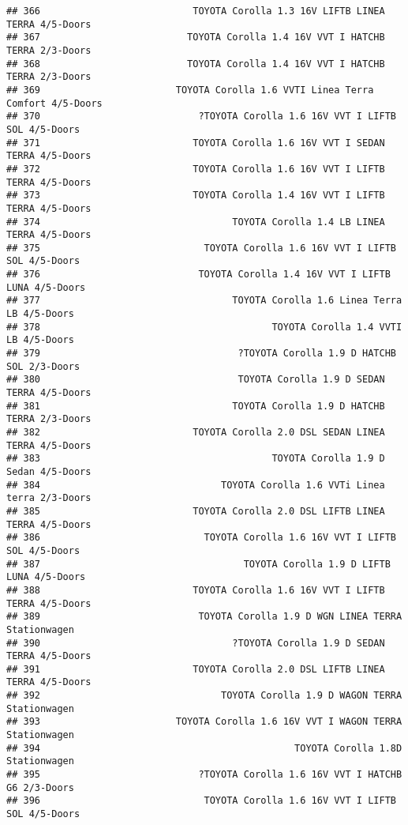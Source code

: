 \documentclass[]{article}
\begin{document}
\begin{verbatim}
## 366                           TOYOTA Corolla 1.3 16V LIFTB LINEA TERRA 4/5-Doors
## 367                          TOYOTA Corolla 1.4 16V VVT I HATCHB TERRA 2/3-Doors
## 368                          TOYOTA Corolla 1.4 16V VVT I HATCHB TERRA 2/3-Doors
## 369                        TOYOTA Corolla 1.6 VVTI Linea Terra Comfort 4/5-Doors
## 370                            ?TOYOTA Corolla 1.6 16V VVT I LIFTB SOL 4/5-Doors
## 371                           TOYOTA Corolla 1.6 16V VVT I SEDAN TERRA 4/5-Doors
## 372                           TOYOTA Corolla 1.6 16V VVT I LIFTB TERRA 4/5-Doors
## 373                           TOYOTA Corolla 1.4 16V VVT I LIFTB TERRA 4/5-Doors
## 374                                  TOYOTA Corolla 1.4 LB LINEA TERRA 4/5-Doors
## 375                             TOYOTA Corolla 1.6 16V VVT I LIFTB SOL 4/5-Doors
## 376                            TOYOTA Corolla 1.4 16V VVT I LIFTB LUNA 4/5-Doors
## 377                                  TOYOTA Corolla 1.6 Linea Terra LB 4/5-Doors
## 378                                         TOYOTA Corolla 1.4 VVTI LB 4/5-Doors
## 379                                   ?TOYOTA Corolla 1.9 D HATCHB SOL 2/3-Doors
## 380                                   TOYOTA Corolla 1.9 D SEDAN TERRA 4/5-Doors
## 381                                  TOYOTA Corolla 1.9 D HATCHB TERRA 2/3-Doors
## 382                           TOYOTA Corolla 2.0 DSL SEDAN LINEA TERRA 4/5-Doors
## 383                                         TOYOTA Corolla 1.9 D Sedan 4/5-Doors
## 384                                TOYOTA Corolla 1.6 VVTi Linea terra 2/3-Doors
## 385                           TOYOTA Corolla 2.0 DSL LIFTB LINEA TERRA 4/5-Doors
## 386                             TOYOTA Corolla 1.6 16V VVT I LIFTB SOL 4/5-Doors
## 387                                    TOYOTA Corolla 1.9 D LIFTB LUNA 4/5-Doors
## 388                           TOYOTA Corolla 1.6 16V VVT I LIFTB TERRA 4/5-Doors
## 389                            TOYOTA Corolla 1.9 D WGN LINEA TERRA Stationwagen
## 390                                  ?TOYOTA Corolla 1.9 D SEDAN TERRA 4/5-Doors
## 391                           TOYOTA Corolla 2.0 DSL LIFTB LINEA TERRA 4/5-Doors
## 392                                TOYOTA Corolla 1.9 D WAGON TERRA Stationwagen
## 393                        TOYOTA Corolla 1.6 16V VVT I WAGON TERRA Stationwagen
## 394                                             TOYOTA Corolla 1.8D Stationwagen
## 395                            ?TOYOTA Corolla 1.6 16V VVT I HATCHB G6 2/3-Doors
## 396                             TOYOTA Corolla 1.6 16V VVT I LIFTB SOL 4/5-Doors

\end{verbatim}
\end{document}
